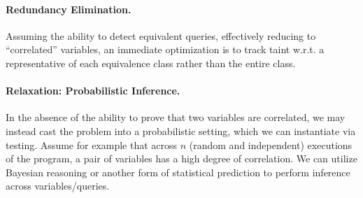 \documentclass[]{article}
\begin{document}
\paragraph{Redundancy Elimination.} Assuming the ability to detect equivalent queries, effectively reducing to ``correlated'' variables, an immediate optimization is to track taint w.r.t. a representative of each equivalence class rather than the entire class.

\paragraph{Relaxation: Probabilistic Inference.} In the absence of the ability to prove that two variables are correlated, we may instead cast the problem into a probabilistic setting, which we can instantiate via testing. Assume for example that across $n$ (random and independent) executions of the program, a pair of variables has a high degree of correlation. We can utilize Bayesian reasoning or another form of statistical prediction to perform inference across variables/queries.
 
\end{document}
